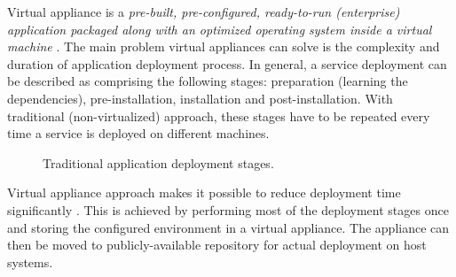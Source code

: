 \documentclass[11pt]{book}
\begin{document}


        Virtual appliance is a \textit{pre-built, pre-configured, ready-to-run (enterprise) application packaged along
        with an optimized operating system inside a virtual machine} \cite{changhua}. The main problem virtual
        appliances can solve is the complexity and duration of application deployment process.  In general, a service
        deployment can be described as comprising the following stages: preparation (learning the dependencies),
        pre-installation, installation and post-installation. With traditional (non-virtualized) approach, these stages
        have to be repeated every time a service is deployed on different machines.

        \begin{figure}[H]
          \begin{center}
          \end{center}

          \caption{Traditional application deployment stages.}
        \end{figure}


        Virtual appliance approach makes it possible to reduce deployment time significantly \cite{changhua}. This is
        achieved by performing most of the deployment stages once and storing the configured environment in a virtual
        appliance. The appliance can then be moved to publicly-available repository for actual deployment on host
        systems.
\end{document}
